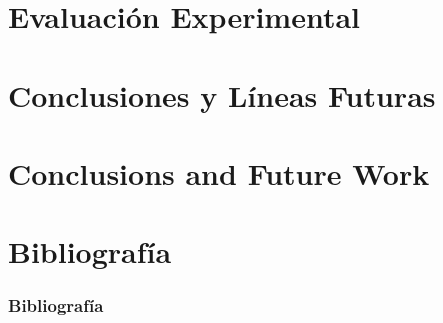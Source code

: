 \documentclass[12pt]{beamer}
\begin{document}
\section{Evaluación Experimental}


\section{Conclusiones y Líneas Futuras}


\section{Conclusions and Future Work}


\section{Bibliografía}
\begin{frame}[allowframebreaks]
        \frametitle{Bibliografía}
        
\end{frame}
  
\end{document}
